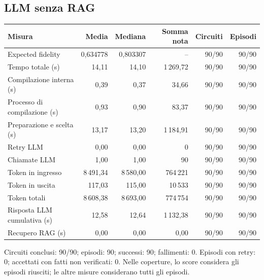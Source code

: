 \subsection{LLM senza RAG}
\begingroup\footnotesize
\setlength{\tabcolsep}{5pt}
\begin{center}
\begin{tabular}{lrrrrr}
\toprule
Misura & Media & Mediana & Somma nota & Circuiti & Episodi \\
\midrule
Expected fidelity & 0,634778 & 0,803307 & -- & 90/90 & 90/90 \\
Tempo totale (s) & 14,11 & 14,10 & 1\,269,72 & 90/90 & 90/90 \\
Compilazione interna (s) & 0,39 & 0,37 & 34,66 & 90/90 & 90/90 \\
Processo di compilazione (s) & 0,93 & 0,90 & 83,37 & 90/90 & 90/90 \\
Preparazione e scelta (s) & 13,17 & 13,20 & 1\,184,91 & 90/90 & 90/90 \\
Retry LLM & 0,00 & 0,00 & 0 & 90/90 & 90/90 \\
Chiamate LLM & 1,00 & 1,00 & 90 & 90/90 & 90/90 \\
Token in ingresso & 8\,491,34 & 8\,580,00 & 764\,221 & 90/90 & 90/90 \\
Token in uscita & 117,03 & 115,00 & 10\,533 & 90/90 & 90/90 \\
Token totali & 8\,608,38 & 8\,693,00 & 774\,754 & 90/90 & 90/90 \\
Risposta LLM cumulativa (s) & 12,58 & 12,64 & 1\,132,38 & 90/90 & 90/90 \\
Recupero RAG (s) & 0,00 & 0,00 & 0,00 & 90/90 & 90/90 \\
\bottomrule
\end{tabular}
\end{center}
\endgroup
Circuiti conclusi: 90/90; episodi: 90; successi: 90; fallimenti: 0. Episodi con retry: 0; accettati con fatti non verificati: 0. Nelle coperture, lo score considera gli episodi riusciti; le altre misure considerano tutti gli episodi.

